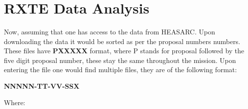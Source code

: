 \documentclass[a4paper,twoside]{report}
\numberwithin{equation}{section}
\begin{document}
\section{RXTE Data Analysis}
\paragraph{}
Now, assuming that one has access to the data from HEASARC. Upon downloading the data it would be sorted as per the proposal numbers numbers. These files have \textbf{PXXXXX} format, where P stands for proposal followed by the five digit proposal number, these stay the same throughout the mission. Upon entering the file one would find multiple files, they are of the following format:
\begin{center}
\textbf{NNNNN-TT-VV-SSX}
\end{center}
Where:
\end{document}
